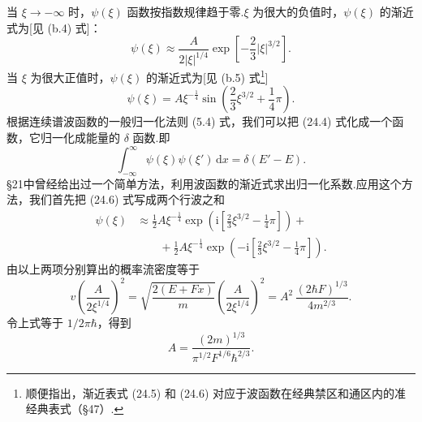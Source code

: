 当 $\xi\to-\infty$ 时，$\psi(\xi)$ 函数按指数规律趋于零.$\xi$ 为很大的负值时，$\psi(\xi)$ 的渐近式为[见 (b.4) 式]：
\begin{equation}
  \psi(\xi)\approx\frac{A}{2|\xi|^{1/4}}
  \exp\left[-\frac{2}{3}|\xi|^{3/2}\right].
\end{equation}
当 $\xi$ 为很大正值时，$\psi(\xi)$ 的渐近式为[见 (b.5) 式\footnote{顺便指出，渐近表式 (24.5) 和 (24.6) 对应于波函数在经典禁区和通区内的准经典表式（§47）.}]
\begin{equation}
  \psi(\xi)=A\xi^{-\frac{1}{4}}
  \sin\left(\frac{2}{3}\xi^{3/2}+\frac{1}{4}\pi\right).
\end{equation}
根据连续谱波函数的一般归一化法则 (5.4) 式，我们可以把 (24.4) 式化成一个函数，它归一化成能量的 $\delta$ 函数.即
\begin{equation}
  \int_{-\infty}^{\infty}\psi(\xi)\psi(\xi')\,\mathrm{d}x
  =\delta\left(E'-E\right).
\end{equation}
§21中曾经给出过一个简单方法，利用波函数的渐近式求出归一化系数.应用这个方法，我们首先把 (24.6) 式写成两个行波之和
\begin{equation*}
\begin{aligned}
  \psi(\xi)&\approx\frac{1}{2}A\xi^{-\frac{1}{4}}
  \exp\left(\mathrm{i}\left[\frac{2}{3}\xi^{3/2}-\frac{1}{4}\pi\right]\right)+\\
  &\qquad+\frac{1}{2}A\xi^{-\frac{1}{4}}
  \exp\left(-\mathrm{i}\left[\frac{2}{3}\xi^{3/2}-\frac{1}{4}\pi\right]\right).
\end{aligned}
\end{equation*}
由以上两项分别算出的概率流密度等于
\begin{equation*}
  v\left(\frac{A}{2\xi^{1/4}}\right)^2
  =\sqrt{\frac{2\left(E+Fx\right)}{m}}
  \left(\frac{A}{2\xi^{1/4}}\right)^2
  =A^2\,\frac{\left(2\hbar F\right)^{1/3}}{4m^{2/3}}.
\end{equation*}
令上式等于 $1/2\pi\hbar$，得到
\begin{equation}
  A=\frac{\left(2m\right)^{1/3}}
  {\pi^{1/2}F^{1/6}\hbar^{2/3}}.
\end{equation}

